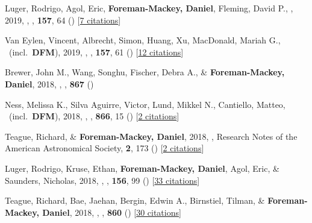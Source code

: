 \item[{\color{numcolor}\scriptsize41}] Luger, Rodrigo, Agol, Eric, \textbf{Foreman-Mackey, Daniel}, Fleming, David P., \etal, 2019, , \aj, \textbf{157}, 64 () [\href{http://adsabs.harvard.edu/abs/2019AJ....157...64L}{7 citations}]

\item[{\color{numcolor}\scriptsize40}] Van Eylen, Vincent, Albrecht, Simon, Huang, Xu, MacDonald, Mariah G., \etal\ (incl.\ \textbf{DFM}), 2019, , \aj, \textbf{157}, 61 () [\href{http://adsabs.harvard.edu/abs/2019AJ....157...61V}{12 citations}]

\item[{\color{numcolor}\scriptsize39}] Brewer, John M., Wang, Songhu, Fischer, Debra A., \& \textbf{Foreman-Mackey, Daniel}, 2018, , \apj, \textbf{867} ()

\item[{\color{numcolor}\scriptsize38}] Ness, Melissa K., Silva Aguirre, Victor, Lund, Mikkel N., Cantiello, Matteo, \etal\ (incl.\ \textbf{DFM}), 2018, , \apj, \textbf{866}, 15 () [\href{http://adsabs.harvard.edu/abs/2018ApJ...866...15N}{2 citations}]

\item[{\color{numcolor}\scriptsize37}] Teague, Richard, \& \textbf{Foreman-Mackey, Daniel}, 2018, , Research Notes of the American Astronomical Society, \textbf{2}, 173 () [\href{http://adsabs.harvard.edu/abs/2018RNAAS...2c.173T}{2 citations}]

\item[{\color{numcolor}\scriptsize36}] Luger, Rodrigo, Kruse, Ethan, \textbf{Foreman-Mackey, Daniel}, Agol, Eric, \& Saunders, Nicholas, 2018, , \aj, \textbf{156}, 99 () [\href{http://adsabs.harvard.edu/abs/2018AJ....156...99L}{33 citations}]

\item[{\color{numcolor}\scriptsize35}] Teague, Richard, Bae, Jaehan, Bergin, Edwin A., Birnstiel, Tilman, \& \textbf{Foreman-Mackey, Daniel}, 2018, , \apj, \textbf{860} () [\href{http://adsabs.harvard.edu/abs/2018ApJ...860L..12T}{30 citations}]

